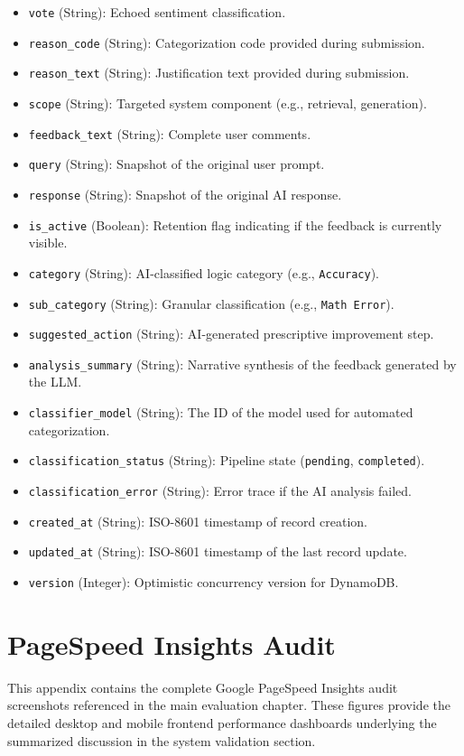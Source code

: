 \begin{itemize}
\begin{itemize}
        \item \texttt{vote} (String): Echoed sentiment classification.
        \item \texttt{reason\_code} (String): Categorization code provided during submission.
        \item \texttt{reason\_text} (String): Justification text provided during submission.
        \item \texttt{scope} (String): Targeted system component (e.g., retrieval, generation).
        \item \texttt{feedback\_text} (String): Complete user comments.
        \item \texttt{query} (String): Snapshot of the original user prompt.
        \item \texttt{response} (String): Snapshot of the original AI response.
        \item \texttt{is\_active} (Boolean): Retention flag indicating if the feedback is currently visible.
        \item \texttt{category} (String): AI-classified logic category (e.g., \texttt{Accuracy}).
        \item \texttt{sub\_category} (String): Granular classification (e.g., \texttt{Math Error}).
        \item \texttt{suggested\_action} (String): AI-generated prescriptive improvement step.
        \item \texttt{analysis\_summary} (String): Narrative synthesis of the feedback generated by the LLM.
        \item \texttt{classifier\_model} (String): The ID of the model used for automated categorization.
        \item \texttt{classification\_status} (String): Pipeline state (\texttt{pending}, \texttt{completed}).
        \item \texttt{classification\_error} (String): Error trace if the AI analysis failed.
        \item \texttt{created\_at} (String): ISO-8601 timestamp of record creation.
        \item \texttt{updated\_at} (String): ISO-8601 timestamp of the last record update.
        \item \texttt{version} (Integer): Optimistic concurrency version for DynamoDB.
    \end{itemize}
\end{itemize}


\chapter{PageSpeed Insights Audit}\label{app:pagespeed_insights}
This appendix contains the complete Google PageSpeed Insights audit screenshots referenced in the main evaluation chapter. These figures provide the detailed desktop and mobile frontend performance dashboards underlying the summarized discussion in the system validation section.

